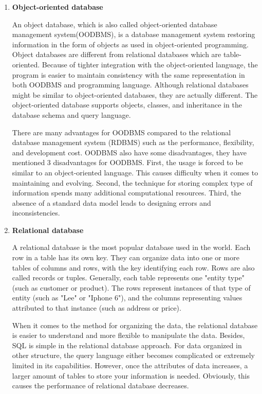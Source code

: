 \begin{enumerate}
	
	
	\item\textbf{Object-oriented database}
	\setlength{\parindent}{1em}		
	
	An object database, which is also called object-oriented database management system(OODBMS), is a database management system restoring information in the form of objects as used in object-oriented programming.
	Object databases are different from relational databases which are table-oriented.
	Because of tighter integration with the object-oriented language, 
	the program is easier to maintain consistency with the same representation in both OODBMS and programming language.
	Although relational databases might be similar to object-oriented databases, they are actually different.
	The object-oriented database supports objects, classes, and inheritance in the database schema and query language.
	
	There are many advantages for OODBMS compared to the relational database management system (RDBMS) such as the performance, flexibility, and development cost.
	OODBMS also have some disadvantages, they have mentioned 3 disadvantages for OODBMS.
	First, the usage is forced to be similar to an object-oriented language.
	This causes difficulty when it comes to maintaining and evolving.
	Second, the technique for storing complex type of information spends many additional computational resources.
	Third, the absence of a standard data model leads to designing errors and inconsistencies.
	
	
	
	\item\textbf{Relational database}
	\setlength{\parindent}{1em}	
	
	A relational database is the most popular database used in the world.
	Each row in a table has its own key. 
	They can organize data into one or more tables of columns and rows, with the key identifying each row.
	Rows are also called records or tuples.
	Generally, each table represents one "entity type" (such as customer or product).
	The rows represent instances of that type of entity (such as "Lee" or "Iphone 6"), 
	and the columns representing values attributed to that instance (such as address or price).
	
	When it comes to the method for organizing the data, the relational database is easier to understand and more flexible to manipulate the data.
	Besides, SQL is simple in the relational database approach.
	For data organized in other structure, the query language either becomes complicated or extremely limited in its capabilities.
	However, once the attributes of data increases, a larger amount of tables to store your information is needed.
	Obviously, this causes the performance of relational database decreases.



\end{enumerate}
